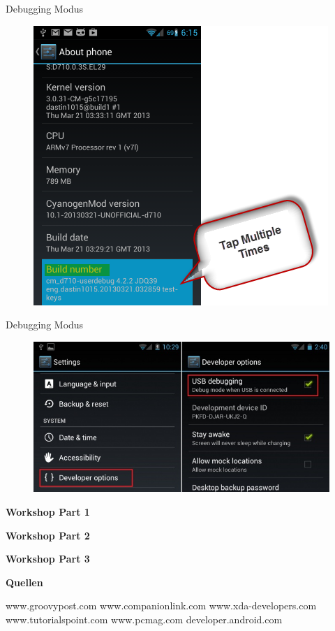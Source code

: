 \documentclass{beamer}
\begin{document}
\begin{frame}{Debugging Modus}
\begin{figure}[hb]
 \centering
 \includegraphics[scale=0.4]{android-build}
\end{figure}
\end{frame}

\begin{frame}{Debugging Modus}
\begin{figure}[hb]
 \centering
 \includegraphics[scale=0.4]{android-debugging}
\end{figure}
\end{frame}

\begin{frame}
\begin{center}
\huge\textbf{Workshop Part 1}
\end{center}
\end{frame}

\begin{frame}
\begin{center}
\huge\textbf{Workshop Part 2}
\end{center}
\end{frame}

\begin{frame}
\begin{center}
\huge\textbf{Workshop Part 3}
\end{center}
\end{frame}

\begin{frame}
\begin{center}
\huge\textbf{Quellen}

www.groovypost.com
www.companionlink.com
www.xda-developers.com
www.tutorialspoint.com
www.pcmag.com
developer.android.com
\end{center}
\end{frame}
\end{document}
